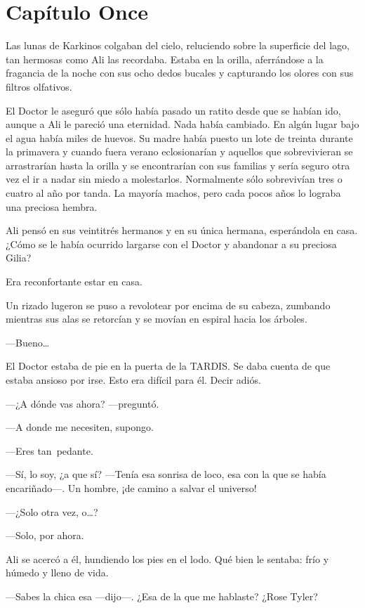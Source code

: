 \chapter*{Capítulo Once}


Las lunas de Karkinos colgaban del cielo, reluciendo sobre la superficie
del lago, tan hermosas como Ali las recordaba. Estaba en la orilla,
aferrándose a la fragancia de la noche con sus ocho dedos bucales y
capturando los olores con sus filtros olfativos.

El Doctor le aseguró que sólo había pasado un ratito desde que se habían
ido, aunque a Ali le pareció una eternidad. Nada había cambiado. En
algún lugar bajo el agua había miles de huevos. Su madre había puesto un
lote de treinta durante la primavera y cuando fuera verano eclosionarían
y aquellos que sobrevivieran se arrastrarían hasta la orilla y se
encontrarían con sus familias y sería seguro otra vez el ir a nadar sin
miedo a molestarlos. Normalmente sólo sobrevivían tres o cuatro al año
por tanda. La mayoría machos, pero cada pocos años lo lograba una
preciosa hembra.

Ali pensó en sus veintitrés hermanos y en su única hermana, esperándola
en casa. ¿Cómo se le había ocurrido largarse con el Doctor y abandonar a
su preciosa Gilia?

Era reconfortante estar en casa.

Un rizado lugeron se puso a revolotear por encima de su cabeza, zumbando
mientras sus alas se retorcían y se movían en espiral hacia los árboles.

---Bueno\ldots{}

El Doctor estaba de pie en la puerta de la TARDIS. Se daba cuenta de que
estaba ansioso por irse. Esto era difícil para él. Decir adiós.

---¿A dónde vas ahora? ---preguntó.

---A donde me necesiten, supongo.

---Eres tan~pedante.

---Sí, lo soy, ¿a que sí? ---Tenía esa sonrisa de loco, esa con la que
se había encariñado---. Un hombre, ¡de camino a salvar el universo!

---¿Solo otra vez, o\ldots{}?

---Solo, por ahora.

Ali se acercó a él, hundiendo los pies en el lodo. Qué bien le sentaba:
frío y húmedo y lleno de vida.

---Sabes la chica esa ---dijo---. ¿Esa de la que me hablaste? ¿Rose
Tyler?


